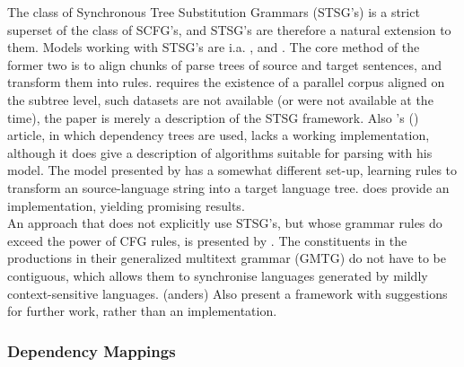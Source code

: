 \documentclass{report}
\theoremstyle{definition}
\theoremstyle{plain}
\def\citepos#1{\citeauthor{#1}'s (\citeyear{#1})}
\begin{document}
The class of Synchronous Tree Substitution Grammars (STSG's) is a strict superset of the class of SCFG's, and STSG's are therefore a natural extension to them. Models working with STSG's are i.a. \cite{poutsma2000data}, \cite{eisner2003learning} and \cite{galley2004s,galley2006scalable}. The core method of the former two is to align chunks of parse trees of source and target sentences, and transform them into rules. \cite{poutsma2000data} requires the existence of a parallel corpus aligned on the subtree level, such datasets are not available (or were not available at the time), the paper is merely a description of the STSG framework. Also \citepos{eisner2003learning} article, in which dependency trees are used, lacks a working implementation, although it does give a description of algorithms suitable for parsing with his model. The model presented by \citeauthor{galley2004s} has a somewhat different set-up, learning rules to transform an source-language string into a target language tree. \cite{galley2006scalable} does provide an implementation, yielding promising results.\\
An approach that does not explicitly use STSG's, but whose grammar rules do exceed the power of CFG rules, is presented by \cite{melamed2004generalized}. The constituents in the productions in their generalized multitext grammar (GMTG) do not have to be contiguous, which allows them to synchronise languages generated by mildly context-sensitive languages. (anders) Also \citeauthor{melamed2004generalized} present a framework with suggestions for further work, rather than an implementation.


\subsubsection{Dependency Mappings}
\end{document}
